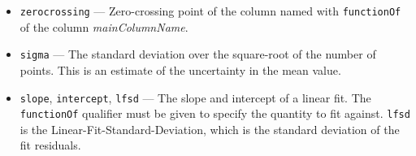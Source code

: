 \begin{itemize}
\begin{itemize}
\begin{itemize}
\begin{itemize}
\item {\tt zerocrossing} --- Zero-crossing point of the column named with {\tt functionOf} of the
column {\em mainColumnName}.

\item {\tt sigma} --- The standard deviation over the square-root of the number of points.  This is an
estimate of the uncertainty in the mean value.

\item {\tt slope}, {\tt intercept}, {\tt lfsd} --- The slope and intercept of a linear fit.  The {\tt functionOf}
qualifier must be given to specify the quantity to fit against.  {\tt lfsd} is the Linear-Fit-Standard-Deviation,
which is the standard deviation of the fit residuals.

\end{itemize}


\end{itemize}
\end{itemize}
\end{itemize}
